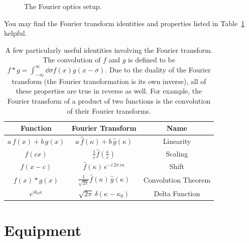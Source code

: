 \documentclass[]{manual}
\begin{document}
\begin{figure}

        \caption{The Fourier optics setup.}

        \label{fig:fourier-optics-setup}
    \end{figure}

    You may find the Fourier transform identities and properties listed in Table~\ref{tab:fourier-transform-properties} helpful.

    \begin{table}
        \centering

        \renewcommand{\arraystretch}{1.5}
        \begin{tabular}{ c c c }
            Function & Fourier Transform & Name \\
            \hline
            $a \, f(x) + b \, g(x)$ & $a \, \hat{f}(\kappa) + b \, \hat{g}(\kappa)$ & Linearity \\
            $f(c x)$ & $\frac{1}{c} \hat{f}(\frac{\kappa}{c})$ & Scaling \\
            $f(x - c)$ & $\hat{f}(\kappa) \, e^{-i \, 2 \pi \, c \kappa}$ & Shift \\
            $f(x) * g(x)$ & $\frac{1}{\sqrt{2 \pi}} \hat{f}(\kappa) \, \hat{g}(\kappa)$ & Convolution Theorem \\
            $e^{i k_0 \kappa}$ & $\sqrt{2 \pi} \, \delta(\kappa - \kappa_0)$ & Delta Function \\
        \end{tabular}
        \renewcommand{\arraystretch}{1}

        \caption{
            A few particularly useful identities involving the Fourier transform.
            The convolution of $f$ and $g$ is defined to be $f * g = \int_{-\infty}^{\infty} \dd{\sigma} f(x) g(x - \sigma)$.
            Due to the duality of the Fourier transform (the Fourier transformation is its own inverse), all of these properties are true in reverse as well.
            For example, the Fourier transform of a product of two functions is the convolution of their Fourier transforms.
        }

        \label{tab:fourier-transform-properties}
    \end{table}


    \section{Equipment}
\end{document}
